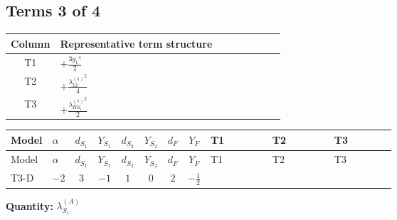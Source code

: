 \documentclass[8pt]{article}
\begin{document}
\begin{landscape}
\subsection*{Terms 3 of 4}
\begin{center}
\begin{tabular}{@{}c >{\raggedright\arraybackslash}p{0.82\linewidth}@{}}
\toprule
Column & Representative term structure \\
\midrule
T1 & \(\displaystyle +\frac{3 {g_1}^4}{2}\) \\
\midrule
T2 & \(\displaystyle +\frac{{\lambda_{12}^{(1)}}^2}{4}\) \\
\midrule
T3 & \(\displaystyle +\frac{{\lambda_{HS_1}^{(1)}}^2}{2}\) \\
\midrule
\bottomrule
\end{tabular}
\end{center}
\smallskip
\tiny
\begin{longtable}{@{}llcccccc >{\raggedright\arraybackslash}p{0.21\linewidth} >{\raggedright\arraybackslash}p{0.21\linewidth} >{\raggedright\arraybackslash}p{0.21\linewidth}@{}}
\toprule
Model & $\alpha$ & $d_{S_1}$ & $Y_{S_1}$ & $d_{S_2}$ & $Y_{S_2}$ & $d_F$ & $Y_F$ & T1 & T2 & T3 \\
\midrule
\endfirsthead
\toprule
Model & $\alpha$ & $d_{S_1}$ & $Y_{S_1}$ & $d_{S_2}$ & $Y_{S_2}$ & $d_F$ & $Y_F$ & T1 & T2 & T3 \\
\midrule
\endhead
T3-D & $-2$ & $3$ & $-1$ & $1$ & $0$ & $2$ & $-\frac{1}{2}$ & \scriptsize\adjustbox{max width=\linewidth}{$\begin{gathered} +\frac{3 {g_1}^4}{2}\end{gathered}$} & \scriptsize\adjustbox{max width=\linewidth}{$\begin{gathered} +\frac{{\lambda_{12}^{(1)}}^2}{4}\end{gathered}$} & \scriptsize\adjustbox{max width=\linewidth}{$\begin{gathered} +\frac{{\lambda_{HS_1}^{(1)}}^2}{2}\end{gathered}$} \\
\midrule
\bottomrule
\end{longtable}
\clearpage
\noindent\textbf{Quantity: }$\lambda_{S_1}^{(A)}$\par\smallskip

\end{landscape}
\end{document}

